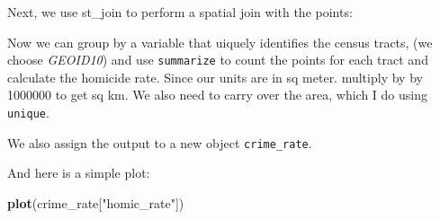\documentclass[]{book}
\newenvironment{Shaded}{\begin{snugshade}}{\end{snugshade}}
\newcommand{\KeywordTok}[1]{\textcolor[rgb]{0.13,0.29,0.53}{\textbf{#1}}}
\newcommand{\DataTypeTok}[1]{\textcolor[rgb]{0.13,0.29,0.53}{#1}}
\newcommand{\FloatTok}[1]{\textcolor[rgb]{0.00,0.00,0.81}{#1}}
\newcommand{\StringTok}[1]{\textcolor[rgb]{0.31,0.60,0.02}{#1}}
\newcommand{\OperatorTok}[1]{\textcolor[rgb]{0.81,0.36,0.00}{\textbf{#1}}}
\newcommand{\NormalTok}[1]{#1}
\begin{document}
Next, we use st\_join to perform a spatial join with the points:

\begin{Shaded}
\end{Shaded}

Now we can group by a variable that uiquely identifies the census
tracts, (we choose \emph{GEOID10}) and use \texttt{summarize} to count
the points for each tract and calculate the homicide rate. Since our
units are in sq meter. multiply by by 1000000 to get sq km. We also need
to carry over the area, which I do using \texttt{unique}.

We also assign the output to a new object \texttt{crime\_rate}.

\begin{Shaded}
\end{Shaded}

And here is a simple plot:

\begin{Shaded}
\begin{Highlighting}[]
\KeywordTok{plot}\NormalTok{(crime_rate[}\StringTok{"homic_rate"}\NormalTok{])}
\end{Highlighting}
\end{Shaded}
\end{document}
